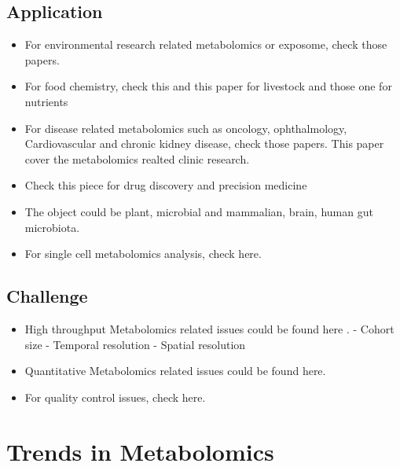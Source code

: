 \documentclass[
]{book}
\begin{document}
\hypertarget{application}{%
\subsection{Application}\label{application}}

\begin{itemize}
\item
  For environmental research related metabolomics or exposome, check those papers\citep{bundy2009, warth2017}.
\item
  For food chemistry, check this\citep{castro-puyana2017} and this paper for livestock\citep{goldansaz2017} and those one for nutrients\citep{allam-ndoul2016, jones2012}
\item
  For disease related metabolomics such as oncology\citep{spratlin2009, tumas2016}, ophthalmology\citep{tan2016}, Cardiovascular\citep{cheng2017} and chronic kidney disease\citep{hocher2017}, check those papers. This paper\citep{kennedy2018} cover the metabolomics realted clinic research.
\item
  Check this piece\citep{wishart2016} for drug discovery and precision medicine
\item
  The object could be plant\citep{jorge2016a, sumner2003}, microbial and mammalian\citep{kapoore2016b}, brain\citep{gonzalez-riano2016}, human gut microbiota\citep{smirnov2016}.
\item
  For single cell metabolomics analysis, check here\citep{fessenden2016, zenobi2013}.
\end{itemize}

\hypertarget{challenge}{%
\subsection{Challenge}\label{challenge}}

\begin{itemize}
\item
  High throughput Metabolomics related issues could be found here \citep{zampieri2017}.
  - Cohort size
  - Temporal resolution
  - Spatial resolution
\item
  Quantitative Metabolomics related issues could be found here\citep{kapoore2016b, jorge2016a}.
\item
  For quality control issues, check here\citep{dudzik2018, siskos2017}.
\end{itemize}

\hypertarget{trends-in-metabolomics}{%
\section{Trends in Metabolomics}\label{trends-in-metabolomics}}
\end{document}

